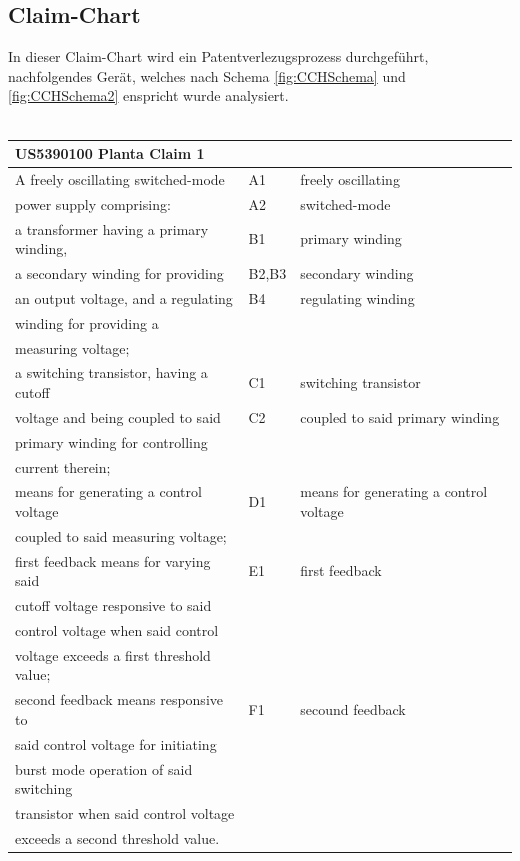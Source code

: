 \subsection{Claim-Chart}\label{sec:Claim-Chart}
In dieser Claim-Chart wird ein Patentverlezugsprozess durchgeführt, nachfolgendes Gerät, welches nach Schema \ref{fig:CCHSchema} und \ref{fig:CCHSchema2} enspricht wurde analysiert.\\
\\

\begin{tabular}{|l|l|l|}
	\hline 
\textbf{US5390100 Planta Claim 1}& &    \\ 
	\hline 
 A freely oscillating switched-mode &A1 & freely oscillating\\
 power supply comprising:	& A2 &switched-mode  \\ 
	\hline 
a transformer having a primary winding,& B1 &primary winding\\
a secondary winding for providing &B2,B3 &secondary winding\\ 
an output voltage, and a regulating& B4&regulating winding\\
winding for providing a& & \\
measuring voltage; & &	 \\
	\hline 
a switching transistor, having a cutoff& C1 & switching transistor \\
voltage and being coupled to said  &C2  &coupled to said primary winding \\
primary winding for controlling & & \\
current therein;	&  &  \\ 
	\hline 
means for generating a control voltage& D1 & means for generating a control voltage\\
coupled to said measuring voltage;	&  & \\ 
	\hline 
first feedback means for varying said & E1 &first feedback\\
cutoff voltage responsive to said  &  &\\
control voltage when said control & &\\
voltage exceeds a first threshold value;  & &\\ 
	\hline 
second feedback means responsive to& F1&secound feedback\\
said control voltage for initiating  &  &\\
burst mode operation of said switching& & \\
transistor when said control voltage & &\\
exceeds a second threshold value.	&  &  \\ 
	\hline 


\end{tabular} 



